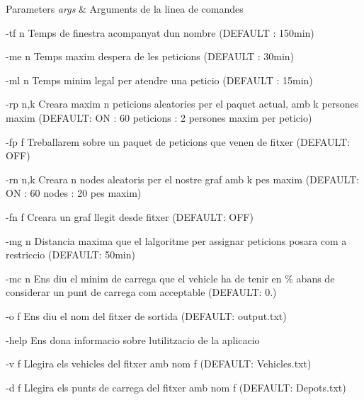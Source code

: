 \begin{DoxyParams}{Parameters}
{\em args} & Arguments de la linea de comandes \begin{DoxyItemize}
\item -\/tf n Temps de finestra acompanyat d\textquotesingle{}un nombre (D\+E\+F\+A\+U\+LT \+: 150min) \item -\/me n Temps maxim d\textquotesingle{}espera de les peticions (D\+E\+F\+A\+U\+LT \+: 30min) \item -\/ml n Temps minim legal per atendre una peticio (D\+E\+F\+A\+U\+LT \+: 15min) \item -\/rp n,k Creara maxim n peticions aleatories per el paquet actual, amb k persones maxim (D\+E\+F\+A\+U\+LT\+: ON \+: 60 peticions \+: 2 persones maxim per peticio) \item -\/fp f Treballarem sobre un paquet de peticions que venen de fitxer (D\+E\+F\+A\+U\+LT\+: O\+FF) \item -\/rn n,k Creara n nodes aleatoris per el nostre graf amb k pes maxim (D\+E\+F\+A\+U\+LT\+: ON \+: 60 nodes \+: 20 pes maxim) \item -\/fn f Creara un graf llegit desde fitxer (D\+E\+F\+A\+U\+LT\+: O\+FF) \item -\/mg n Distancia maxima que el l\textquotesingle{}algoritme per assignar peticions posara com a restriccio (D\+E\+F\+A\+U\+LT\+: 50min) \item -\/mc n Ens diu el minim de carrega que el vehicle ha de tenir en \% abans de considerar un punt de carrega com acceptable (D\+E\+F\+A\+U\+LT\+: 0.) \item -\/o f Ens diu el nom del fitxer de sortida (D\+E\+F\+A\+U\+LT\+: output.\+txt) \item -\/help Ens dona informacio sobre l\textquotesingle{}utilitzacio de la aplicacio \item -\/v f Llegira els vehicles del fitxer amb nom f (D\+E\+F\+A\+U\+LT\+: Vehicles.\+txt) \item -\/d f Llegira els punts de carrega del fitxer amb nom f (D\+E\+F\+A\+U\+LT\+: Depots.\+txt) \end{DoxyItemize}
\\
\hline
\end{DoxyParams}
\mbox{\label{class_portam_a_pro_p_1_1_portam_a_prop_a608de07917e52018d5815d8bc5626902}} 
